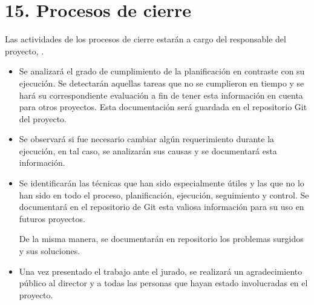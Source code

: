 \section{15. Procesos de cierre}    
\label{sec:cierre}

Las actividades de los procesos de cierre estarán a cargo del responsable del proyecto, \authorname .

\begin{itemize}
\item Se analizará el grado de cumplimiento de la planificación en contraste con su ejecución. Se detectarán aquellas tareas que no se cumplieron en tiempo y se hará su correspondiente evaluación a fin de tener esta información en cuenta para otros proyectos. Esta documentación será guardada en el repositorio Git del proyecto.

\item Se observará si fue necesario cambiar algún requerimiento durante la ejecución, en tal caso, se analizarán sus causas y se documentará esta información.

\item Se identificarán las técnicas que han sido especialmente útiles y las que no lo han sido en todo el proceso, planificación, ejecución, seguimiento y control. Se documentará en el repositorio de Git esta valiosa información para su uso en futuros proyectos.

De la misma manera, se documentarán en repositorio los problemas surgidos y sus soluciones.

\item Una vez presentado el trabajo ante el jurado, se realizará un agradecimiento público al
director y a todas las personas que hayan estado involucradas en el proyecto.

\end{itemize}






